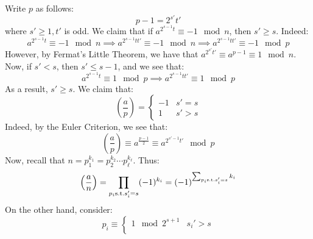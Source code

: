 \documentclass{article}
\begin{document}
\begin{pf}[source=Primary Source Material]
\begin{enumerate}
\begin{enumerate}
                Write $ p $ as follows:
                \begin{equation*}
                    p - 1 = 2^{s'}t'
                \end{equation*}
                where $ s' \geq 1, t' $ is odd.
                We claim that if $ a^{2^{s-1}t} \equiv -1 \mod n $, then $ s' \geq s $.
                Indeed:
                \begin{equation*}
                    a^{2^{s-1}t} \equiv -1 \mod n \implies a^{2^{s-1}tt'} \equiv -1 \mod n
                                                  \implies a^{2^{s-1}tt'} \equiv -1 \mod p
                \end{equation*}
                However, by Fermat's Little Theorem,
                we have that $ a^{2^{s'}t'} \equiv a^{p-1} \equiv 1 \mod n $. \vsp
                Now, if $ s' < s $, then $ s' \leq s-1 $, and
                we see that:
                \begin{equation*}
                    a^{2^{s-1}t} \equiv 1 \mod p \implies a^{2^{s-1}tt'} \equiv 1 \mod p
                \end{equation*}
                As a result, $ s' \geq s $. We claim that:
                \begin{equation*}
                    \left( \frac{a}{p} \right) =
                    \begin{cases} -1 & s' = s \\ 1 & s' > s \end{cases}
                \end{equation*}
                Indeed, by the Euler Criterion, we see that:
                \begin{equation*}
                    \left( \frac{a}{p} \right) \equiv a^{\frac{p-1}{2}} \equiv a^{2^{s'-1}t'} \mod p
                \end{equation*}
                Now, recall that $ n = p_{1}^{k_{1}}=p_{2}^{k_{2}}\cdots p_{\ell}^{k_{\ell}} $.
                Thus:
                \begin{equation*}
                    \left( \frac{a}{n} \right) = \prod_{p_{i} \textrm{s.t.} s_{i}'=s}(-1)^{k_{i}}
                    = (-1)^{\sum_{p_{i} \textrm{s.t.} s_{i}'=s}^{} {k_{i}} }
                \end{equation*}
                On the other hand, consider:
                \begin{equation*}
                    p_{i} \equiv \begin{cases} 1 \mod 2^{s+1} & s_{i}' > s \\

\end{cases}
\end{equation*}
\end{enumerate}
\end{enumerate}
\end{pf}
\end{document}
